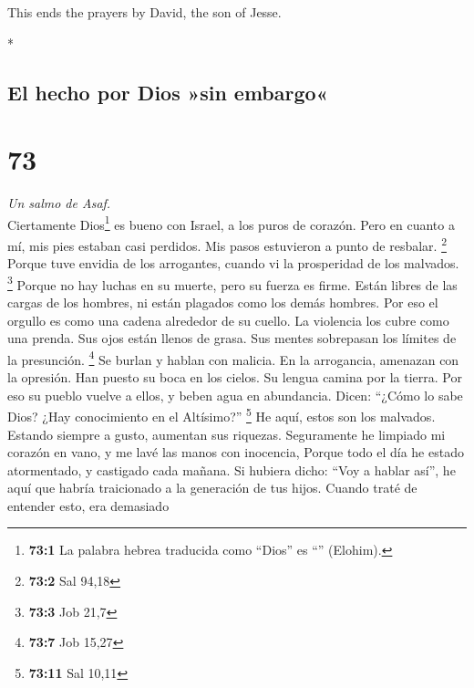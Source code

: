 \begin{paracol}{2}
\begin{otherlanguage}{english}
 This ends the prayers by David, the son of Jesse.

\end{otherlanguage}

\switchcolumn[0]*

\hypertarget{el-hecho-por-dios-sin-embargo}{%
\subsection{El hecho por Dios »sin
embargo«}\label{el-hecho-por-dios-sin-embargo}}

\hypertarget{section-144}{%
\section{73}\label{section-144}}

\emph{Un salmo de Asaf.}\\
 Ciertamente Dios\footnote{\textbf{73:1} La palabra hebrea
  traducida como ``Dios'' es ``'' (Elohim).} es bueno con
Israel, a los puros de corazón.  Pero en cuanto a mí, mis
pies estaban casi perdidos. Mis pasos estuvieron a punto de resbalar.
\footnote{\textbf{73:2} Sal 94,18}  Porque tuve envidia de
los arrogantes, cuando vi la prosperidad de los malvados. \footnote{\textbf{73:3}
  Job 21,7}  Porque no hay luchas en su muerte, pero su
fuerza es firme.  Están libres de las cargas de los
hombres, ni están plagados como los demás hombres.  Por
eso el orgullo es como una cadena alrededor de su cuello. La violencia
los cubre como una prenda.  Sus ojos están llenos de
grasa. Sus mentes sobrepasan los límites de la presunción. \footnote{\textbf{73:7}
  Job 15,27}  Se burlan y hablan con malicia. En la
arrogancia, amenazan con la opresión.  Han puesto su boca
en los cielos. Su lengua camina por la tierra.  Por eso
su pueblo vuelve a ellos, y beben agua en abundancia. 
Dicen: ``¿Cómo lo sabe Dios? ¿Hay conocimiento en el Altísimo?''
\footnote{\textbf{73:11} Sal 10,11}  He aquí, estos son
los malvados. Estando siempre a gusto, aumentan sus riquezas.
 Seguramente he limpiado mi corazón en vano, y me lavé
las manos con inocencia,  Porque todo el día he estado
atormentado, y castigado cada mañana.  Si hubiera dicho:
``Voy a hablar así'', he aquí que habría traicionado a la generación de
tus hijos.  Cuando traté de entender esto, era demasiado

\end{paracol}
